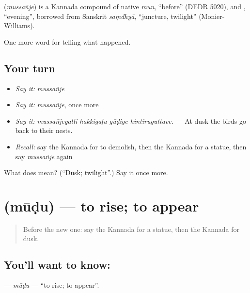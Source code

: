\begin{cousinweb}
\textbf{} (\emph{mussañje}) is a Kannada compound of native \emph{mun}, \textquotedblleft{}before\textquotedblright{} (DEDR 5020), and , \textquotedblleft{}evening\textquotedblright{}, borrowed from Sanskrit \emph{saṃdhyā}, \textquotedblleft{}juncture, twilight\textquotedblright{} (Monier-Williams).
\end{cousinweb}

\begin{grammarlens}[title={What you've built}]
One more word for telling what happened.
\end{grammarlens}

\subsection*{Your turn}
\begin{itemize}
\raggedright
  \item \emph{Say it:} \emph{mussañje}
  \item \emph{Say it:} \emph{mussañje}, once more
  \item \emph{Say it:} \emph{mussañjeyalli hakkigaḷu gūḍige hintiruguttave.} — At dusk the birds go back to their nests.
  \item \emph{Recall:} say the Kannada for to demolish, then the Kannada for a statue, then say \emph{mussañje} again
\end{itemize}

\begin{tcolorbox}[breakable,colback=teal!4,colframe=teal!35!black,title={Before you move on}]
What does  mean? (\textquotedblleft{}Dusk; twilight\textquotedblright{}.) Say it once more.
\end{tcolorbox}
\section[\texorpdfstring{\kn{ಮೂಡು} (mūḍu)}{ಮೂಡು (mūḍu)}]{ (mūḍu) — to rise; to appear}

\label{lesson:KA-C363-mudu}



\begin{quote}
Before the new one: say the Kannada for a statue, then the Kannada for dusk.
\end{quote}

\subsection*{You'll want to know: }
\textbf{} — \emph{mūḍu} — \textquotedblleft{}to rise; to appear\textquotedblright{}.


